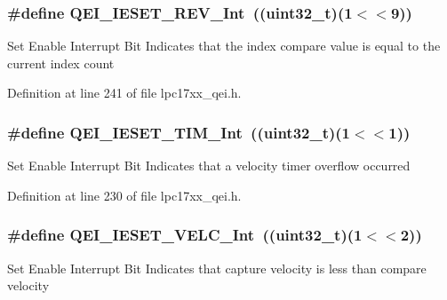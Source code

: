\hypertarget{group___q_e_i___private___macros_gae35f1e90239c5f93eca5a98c0bcfd9d1}{
\subsubsection[{\-Q\-E\-I\-\_\-\-I\-E\-S\-E\-T\-\_\-\-R\-E\-V\-\_\-\-Int}]{\setlength{\rightskip}{0pt plus 5cm}\#define {\bf \-Q\-E\-I\-\_\-\-I\-E\-S\-E\-T\-\_\-\-R\-E\-V\-\_\-\-Int}~((uint32\-\_\-t)(1$<$$<$9))}}\label{group___q_e_i___private___macros_gae35f1e90239c5f93eca5a98c0bcfd9d1}
\-Set \-Enable \-Interrupt \-Bit \-Indicates that the index compare value is equal to the current index count 

\-Definition at line 241 of file lpc17xx\-\_\-qei.\-h.

\hypertarget{group___q_e_i___private___macros_gae281163f64b0bd1ae3d76a6e05fbaeda}{
\subsubsection[{\-Q\-E\-I\-\_\-\-I\-E\-S\-E\-T\-\_\-\-T\-I\-M\-\_\-\-Int}]{\setlength{\rightskip}{0pt plus 5cm}\#define {\bf \-Q\-E\-I\-\_\-\-I\-E\-S\-E\-T\-\_\-\-T\-I\-M\-\_\-\-Int}~((uint32\-\_\-t)(1$<$$<$1))}}\label{group___q_e_i___private___macros_gae281163f64b0bd1ae3d76a6e05fbaeda}
\-Set \-Enable \-Interrupt \-Bit \-Indicates that a velocity timer overflow occurred 

\-Definition at line 230 of file lpc17xx\-\_\-qei.\-h.

\hypertarget{group___q_e_i___private___macros_ga64b1388971445eb625234dd97e62fdb5}{
\subsubsection[{\-Q\-E\-I\-\_\-\-I\-E\-S\-E\-T\-\_\-\-V\-E\-L\-C\-\_\-\-Int}]{\setlength{\rightskip}{0pt plus 5cm}\#define {\bf \-Q\-E\-I\-\_\-\-I\-E\-S\-E\-T\-\_\-\-V\-E\-L\-C\-\_\-\-Int}~((uint32\-\_\-t)(1$<$$<$2))}}\label{group___q_e_i___private___macros_ga64b1388971445eb625234dd97e62fdb5}
\-Set \-Enable \-Interrupt \-Bit \-Indicates that capture velocity is less than compare velocity 

